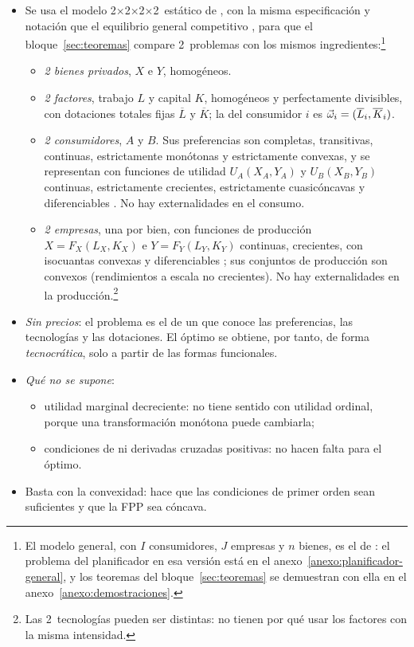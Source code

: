 \documentclass[11pt]{article}
\begin{document}
\begin{itemize}
\item Se usa el modelo 2×2×2×2~estático de \textcite{Bator1957Simple}, con la misma especificación y notación que el equilibrio general competitivo , para que el bloque~\ref{sec:teoremas} compare 2~problemas con los mismos ingredientes:\footnote{El modelo general, con $I$ consumidores, $J$ empresas y $n$ bienes, es el de \textcite[cap.~16]{MasColellWhinstonGreen1995}: el problema del planificador en esa versión está en el anexo~\ref{anexo:planificador-general}, y los teoremas del bloque~\ref{sec:teoremas} se demuestran con ella en el anexo~\ref{anexo:demostraciones}.}
  \begin{itemize}
  \item \emph{2 bienes privados}, $X$ e $Y$, homogéneos.
  \item \emph{2 factores}, trabajo $L$ y capital $K$, homogéneos y perfectamente divisibles, con dotaciones totales fijas $\overline{L}$ y $\overline{K}$; la del consumidor $i$ es $\vec{\omega}_i=(\overline{L}_i,\overline{K}_i)$.
  \item \emph{2 consumidores}, $A$ y $B$. Sus preferencias son completas, transitivas, continuas, estrictamente monótonas y estrictamente convexas, y se representan con funciones de utilidad $U_A(X_A,Y_A)$ y $U_B(X_B,Y_B)$ continuas, estrictamente crecientes, estrictamente cuasicóncavas y diferenciables\nocite{Debreu1959Theory} . No hay externalidades en el consumo.
  \item \emph{2 empresas}, una por bien, con funciones de producción $X=F_X(L_X,K_X)$ e $Y=F_Y(L_Y,K_Y)$ continuas, crecientes, con isocuantas convexas y diferenciables ; sus conjuntos de producción son convexos (rendimientos a escala no crecientes). No hay externalidades en la producción.\footnote{Las 2~tecnologías pueden ser distintas: no tienen por qué usar los factores con la misma intensidad.}
  \end{itemize}
\item \emph{Sin precios}: el problema es el de un  que conoce las preferencias, las tecnologías y las dotaciones. El óptimo se obtiene, por tanto, de forma \emph{tecnocrática}, solo a partir de las formas funcionales.
\item \emph{Qué no se supone}:
  \begin{itemize}
  \item utilidad marginal decreciente: no tiene sentido con utilidad ordinal, porque una transformación monótona puede cambiarla;
  \item condiciones de  ni derivadas cruzadas positivas: no hacen falta para el óptimo.
  \end{itemize}
\item Basta con la convexidad: hace que las condiciones de primer orden sean suficientes y que la FPP sea cóncava.
\end{itemize}
\end{document}
